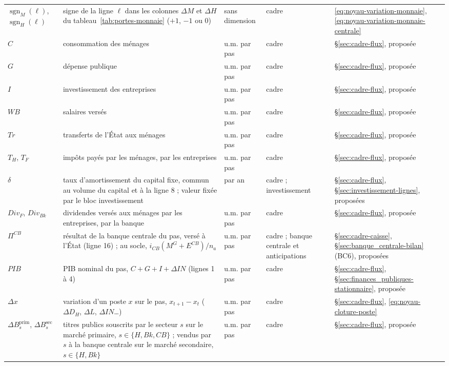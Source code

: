 \documentclass[11pt,a4paper]{article}
\DeclareMathOperator{\sgn}{sgn}
\begin{document}
\begin{center}
\begin{longtable}{>{\raggedright\arraybackslash}p{1.6cm}>{\raggedright\arraybackslash}p{5.6cm}>{\raggedright\arraybackslash}p{2.0cm}>{\raggedright\arraybackslash}p{2.2cm}>{\raggedright\arraybackslash}p{2.8cm}}
$\sgn_M(\ell)$, $\sgn_H(\ell)$ & signe de la ligne $\ell$ dans les colonnes $\Delta M$ et $\Delta H$ du tableau~\ref{tab:portes-monnaie} ($+1$, $-1$ ou 0) & sans dimension & cadre & \eqref{eq:noyau-variation-monnaie}, \eqref{eq:noyau-variation-monnaie-centrale}\\
$C$ & consommation des ménages & u.m. par pas & cadre & \S\ref{sec:cadre-flux}, proposée\\
$G$ & dépense publique & u.m. par pas & cadre & \S\ref{sec:cadre-flux}, proposée\\
$I$ & investissement des entreprises & u.m. par pas & cadre & \S\ref{sec:cadre-flux}, proposée\\
$\mathit{WB}$ & salaires versés & u.m. par pas & cadre & \S\ref{sec:cadre-flux}, proposée\\
$\mathit{Tr}$ & transferts de l'État aux ménages & u.m. par pas & cadre & \S\ref{sec:cadre-flux}, proposée\\
$T_H$, $T_F$ & impôts payés par les ménages, par les entreprises & u.m. par pas & cadre & \S\ref{sec:cadre-flux}, proposée\\
$\delta$ & taux d'amortissement du capital fixe, commun au volume du capital et à la ligne 8 ; valeur fixée par le bloc investissement & par an & cadre ; investissement & \S\ref{sec:cadre-flux}, \S\ref{sec:investissement-lignes}, proposées\\
$\mathit{Div}_F$, $\mathit{Div}_{\mathit{Bk}}$ & dividendes versés aux ménages par les entreprises, par la banque & u.m. par pas & cadre & \S\ref{sec:cadre-flux}, proposée\\
$\Pi^{\mathit{CB}}$ & résultat de la banque centrale du pas, versé à l'État (ligne 16) ; au socle, $i_{\mathit{CB}}(M^G + E^{\mathit{CB}})/n_a$ & u.m. par pas & cadre ; banque centrale et anticipations & \S\ref{sec:cadre-caisse}, \S\ref{sec:banque_centrale-bilan} (BC6), proposées\\
$\mathit{PIB}$ & PIB nominal du pas, $C + G + I + \Delta\mathit{IN}$ (lignes 1 à 4) & u.m. par pas & cadre & \S\ref{sec:cadre-flux}, \S\ref{sec:finances_publiques-stationnaire}, proposée\\
$\Delta x$ & variation d'un poste $x$ sur le pas, $x_{t+1} - x_t$ ($\Delta D_H$, $\Delta L$, $\Delta \mathit{IN}$…) & u.m. par pas & cadre & \S\ref{sec:cadre-flux}, \eqref{eq:noyau-cloture-poste}\\
$\Delta B_s^{\mathrm{prim}}$, $\Delta B_s^{\mathrm{sec}}$ & titres publics souscrits par le secteur $s$ sur le marché primaire, $s \in \{H, \mathit{Bk}, \mathit{CB}\}$ ; vendus par $s$ à la banque centrale sur le marché secondaire, $s \in \{H, \mathit{Bk}\}$ & u.m. par pas & cadre & \S\ref{sec:cadre-flux}, proposée\\

\end{longtable}
\end{center}
\end{document}
